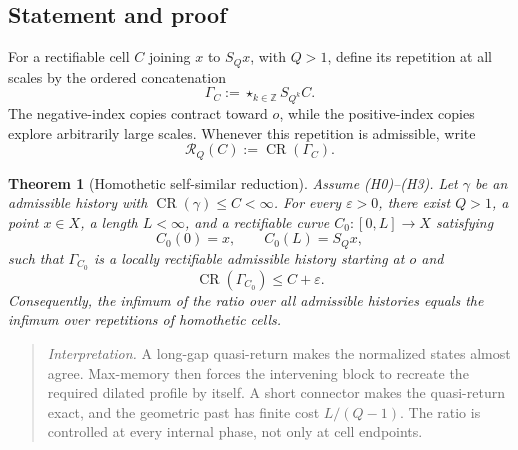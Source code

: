\documentclass[10pt,a4paper]{article}
\newtheorem{theorem}{Theorem}[section]
\theoremstyle{definition}
\theoremstyle{remark}
\DeclareMathOperator{\CR}{CR}
\newcommand{\cellratio}{\mathcal{R}}
\newcommand{\eps}{\varepsilon}
\begin{document}
\subsection{Statement and proof}
For a rectifiable cell $C$ joining $x$ to $S_Qx$, with $Q>1$, define its repetition at all scales by the ordered concatenation
\[
\Gamma_C:=\mathop{\star}_{k\in\mathbb Z}S_{Q^k}C.
\]
The negative-index copies contract toward $o$, while the positive-index copies explore arbitrarily large scales. Whenever this repetition is admissible, write
\[
\cellratio_Q(C):=\CR(\Gamma_C).
\]

\begin{theorem}[Homothetic self-similar reduction]
\label{thm:cell}
Assume \emph{(H0)--(H3)}. Let $\gamma$ be an admissible history with $\CR(\gamma)\le C<\infty$. For every $\eps>0$, there exist $Q>1$, a point $x\in X$, a length $L<\infty$, and a rectifiable curve $C_0:[0,L]\to X$ satisfying
\[
C_0(0)=x,
\qquad
C_0(L)=S_Qx,
\]
such that $\Gamma_{C_0}$ is a locally rectifiable admissible history starting at $o$ and
\[
\CR(\Gamma_{C_0})\le C+\eps.
\]
Consequently, the infimum of the ratio over all admissible histories equals the infimum over repetitions of homothetic cells.
\end{theorem}

\begin{quote}\small
\textit{Interpretation.} A long-gap quasi-return makes the normalized states almost agree. Max-memory then forces the intervening block to recreate the required dilated profile by itself. A short connector makes the quasi-return exact, and the geometric past has finite cost $L/(Q-1)$. The ratio is controlled at every internal phase, not only at cell endpoints.
\end{quote}
\end{document}
